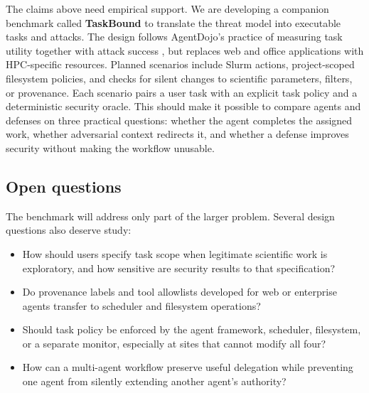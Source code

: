 The claims above need empirical support. We are developing a companion benchmark called \textbf{TaskBound} to translate the threat model into executable tasks and attacks. The design follows AgentDojo's practice of measuring task utility together with attack success \cite{Debenedetti2024AgentDojo}, but replaces web and office applications with HPC-specific resources. Planned scenarios include Slurm actions, project-scoped filesystem policies, and checks for silent changes to scientific parameters, filters, or provenance. Each scenario pairs a user task with an explicit task policy and a deterministic security oracle. This should make it possible to compare agents and defenses on three practical questions: whether the agent completes the assigned work, whether adversarial context redirects it, and whether a defense improves security without making the workflow unusable.

\subsection{Open questions}
\label{sec:open-questions}

The benchmark will address only part of the larger problem. Several design questions also deserve study:

\begin{itemize}[leftmargin=*]
  \item How should users specify task scope when legitimate scientific work is exploratory, and how sensitive are security results to that specification?
  \item Do provenance labels and tool allowlists developed for web or enterprise agents transfer to scheduler and filesystem operations?
  \item Should task policy be enforced by the agent framework, scheduler, filesystem, or a separate monitor, especially at sites that cannot modify all four?
  \item How can a multi-agent workflow preserve useful delegation while preventing one agent from silently extending another agent's authority?
\end{itemize}

